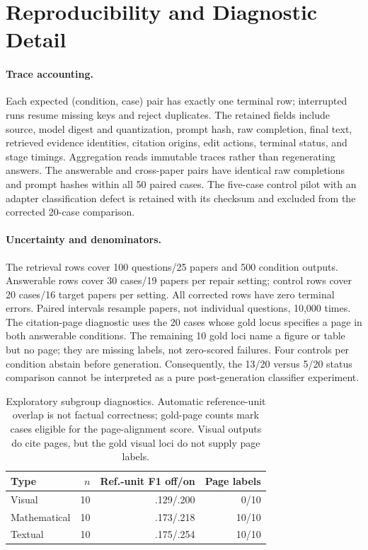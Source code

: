 \section{Reproducibility and Diagnostic Detail}
\paragraph{Trace accounting.}
Each expected (condition, case) pair has exactly one terminal row; interrupted runs resume missing keys and reject duplicates. The retained fields include source, model digest and quantization, prompt hash, raw completion, final text, retrieved evidence identities, citation origins, edit actions, terminal status, and stage timings. Aggregation reads immutable traces rather than regenerating answers. The answerable and cross-paper pairs have identical raw completions and prompt hashes within all 50 paired cases. The five-case control pilot with an adapter classification defect is retained with its checksum and excluded from the corrected 20-case comparison.

\paragraph{Uncertainty and denominators.}
The retrieval rows cover 100 questions/25 papers and 500 condition outputs. Answerable rows cover 30 cases/19 papers per repair setting; control rows cover 20 cases/16 target papers per setting. All corrected rows have zero terminal errors. Paired intervals resample papers, not individual questions, 10,000 times. The citation-page diagnostic uses the 20 cases whose gold locus specifies a page in both answerable conditions. The remaining 10 gold loci name a figure or table but no page; they are missing labels, not zero-scored failures. Four controls per condition abstain before generation. Consequently, the 13/20 versus 5/20 status comparison cannot be interpreted as a pure post-generation classifier experiment.

\begin{table}[h]
\centering
\scriptsize
\begin{tabular}{lrrr}
\toprule
Type & $n$ & Ref.-unit F1 off/on & Page labels \\
\midrule
Visual & 10 & .129/.200 & 0/10 \\
Mathematical & 10 & .173/.218 & 10/10 \\
Textual & 10 & .175/.254 & 10/10 \\
\bottomrule
\end{tabular}
\caption{Exploratory subgroup diagnostics. Automatic reference-unit overlap is not factual correctness; gold-page counts mark cases eligible for the page-alignment score. Visual outputs do cite pages, but the gold visual loci do not supply page labels.}
\label{app:subgroups}
\end{table}

